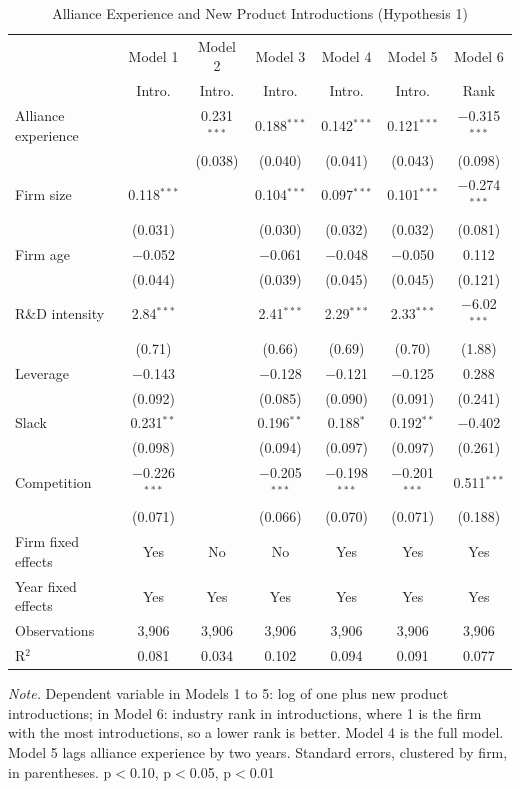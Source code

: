 \documentclass[12pt]{article}
\begin{document}
\begin{table}[p]
\centering\small
\caption{Alliance Experience and New Product Introductions (Hypothesis 1)}
\begin{tabular}{lcccccc}
\toprule
 & Model 1 & Model 2 & Model 3 & Model 4 & Model 5 & Model 6 \\
 & Intro. & Intro. & Intro. & Intro. & Intro. & Rank \\
\midrule
Alliance experience &  & 0.231$^{***}$ & 0.188$^{***}$ & 0.142$^{***}$ & 0.121$^{***}$ & $-$0.315$^{***}$ \\
 &  & (0.038) & (0.040) & (0.041) & (0.043) & (0.098) \\[2pt]
Firm size & 0.118$^{***}$ &  & 0.104$^{***}$ & 0.097$^{***}$ & 0.101$^{***}$ & $-$0.274$^{***}$ \\
 & (0.031) &  & (0.030) & (0.032) & (0.032) & (0.081) \\[2pt]
Firm age & $-$0.052 &  & $-$0.061 & $-$0.048 & $-$0.050 & 0.112 \\
 & (0.044) &  & (0.039) & (0.045) & (0.045) & (0.121) \\[2pt]
R\&D intensity & 2.84$^{***}$ &  & 2.41$^{***}$ & 2.29$^{***}$ & 2.33$^{***}$ & $-$6.02$^{***}$ \\
 & (0.71) &  & (0.66) & (0.69) & (0.70) & (1.88) \\[2pt]
Leverage & $-$0.143 &  & $-$0.128 & $-$0.121 & $-$0.125 & 0.288 \\
 & (0.092) &  & (0.085) & (0.090) & (0.091) & (0.241) \\[2pt]
Slack & 0.231$^{**}$ &  & 0.196$^{**}$ & 0.188$^{*}$ & 0.192$^{**}$ & $-$0.402 \\
 & (0.098) &  & (0.094) & (0.097) & (0.097) & (0.261) \\[2pt]
Competition & $-$0.226$^{***}$ &  & $-$0.205$^{***}$ & $-$0.198$^{***}$ & $-$0.201$^{***}$ & 0.511$^{***}$ \\
 & (0.071) &  & (0.066) & (0.070) & (0.071) & (0.188) \\[2pt]
\midrule
Firm fixed effects & Yes & No & No & Yes & Yes & Yes \\
Year fixed effects & Yes & Yes & Yes & Yes & Yes & Yes \\
Observations & 3,906 & 3,906 & 3,906 & 3,906 & 3,906 & 3,906 \\
R$^2$ & 0.081 & 0.034 & 0.102 & 0.094 & 0.091 & 0.077 \\
\bottomrule
\end{tabular}
\begin{minipage}{0.92\textwidth}\footnotesize\smallskip
\textit{Note.} Dependent variable in Models 1 to 5: log of one plus new product introductions; in Model 6: industry rank in introductions, where 1 is the firm with the most introductions, so a lower rank is better. Model 4 is the full model. Model 5 lags alliance experience by two years. Standard errors, clustered by firm, in parentheses. \textasteriskcentered{} p$<$0.10, \textasteriskcentered{}\textasteriskcentered{} p$<$0.05, \textasteriskcentered{}\textasteriskcentered{}\textasteriskcentered{} p$<$0.01
\end{minipage}
\end{table}
\clearpage
\end{document}
